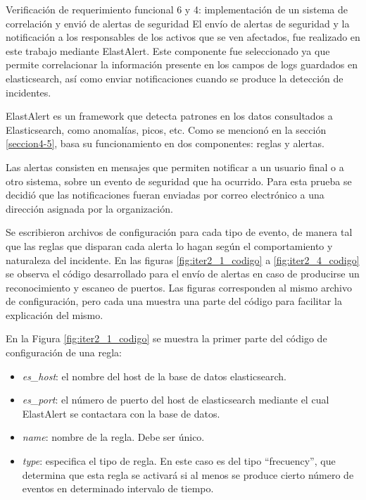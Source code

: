     \begin{section}{Verificación de requerimiento funcional 6 y 4: implementación de un sistema de correlación y envió de alertas de seguridad}
    El envío de alertas de seguridad y la notificación a los responsables de los activos que se ven afectados, fue realizado en este trabajo mediante ElastAlert. Este componente fue seleccionado ya que permite correlacionar la información presente en los campos de logs guardados en elasticsearch, así como enviar notificaciones cuando se produce la detección de incidentes. \par
    ElastAlert es un framework que detecta patrones en los datos consultados a Elasticsearch, como anomalías, picos, etc. Como se mencionó en la sección \ref{seccion4-5}, basa su funcionamiento en dos componentes: reglas y alertas. \par
    Las alertas consisten en mensajes que permiten notificar a un usuario final o a otro sistema, sobre un evento de seguridad que ha ocurrido. Para esta prueba se decidió que las notificaciones fueran enviadas por correo electrónico a una dirección asignada por la organización.\par
    Se escribieron archivos de configuración para cada tipo de evento, de manera tal que las reglas que disparan cada alerta lo hagan según el comportamiento y naturaleza del incidente. En las figuras \ref{fig:iter2_1_codigo} a \ref{fig:iter2_4_codigo} se observa el código desarrollado para el envío de alertas en caso de producirse un reconocimiento y escaneo de puertos. Las figuras corresponden al mismo archivo de configuración, pero cada una muestra una parte del código para facilitar la explicación del mismo.\par
    En la Figura \ref{fig:iter2_1_codigo} se muestra la primer parte del código de configuración de una regla:
    \begin{itemize}
        \item \textit{es\_host}: el nombre del host de la base de datos elasticsearch.
        \item \textit{es\_port}: el número de puerto del host de elasticsearch mediante el cual ElastAlert se contactara con la base de datos.
        \item \textit{name}: nombre de la regla. Debe ser único.
        \item \textit{type}: especifica el tipo de regla. En este caso es del tipo “frecuency”, que determina que esta regla se activará si al menos se produce cierto número de eventos en determinado intervalo de tiempo.

\end{itemize}
\end{section}
